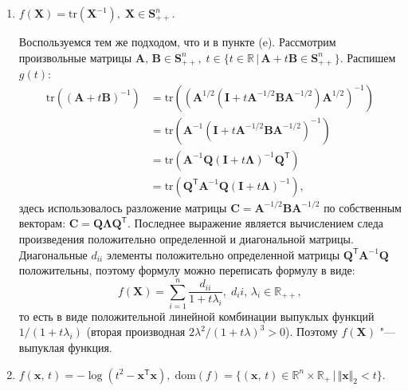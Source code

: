 \documentclass[a4paper,12pt]{article}
\begin{document}
\begin{enumerate}
\begin{enumerate}
			\item 
			$f(\mathbf{X}) = \text{tr}(\mathbf{X}^{-1}),\; \mathbf{X}\in\mathbf{S}_{++}^n$.
			
			Воспользуемся тем же подходом, что и в пункте (e). Рассмотрим произвольные матрицы $\mathbf{A},\,\mathbf{B}\in \mathbf{S}^n_{++},\; t\in \{t\in\mathbb{R}\,|\, \mathbf{A} + t\mathbf{B} \in \mathbf{S}^n_{++} \}$. Распишем $g(t)$:
			\begin{equation*}\begin{aligned}
				\text{tr}((\mathbf{A} + t\mathbf{B})^{-1})& = 
				\text{tr}((\mathbf{A}^{1/2}(\mathbf{I}+ t\mathbf{A}^{-1/2}\mathbf{B}\mathbf{A}^{-1/2})\mathbf{A}^{1/2})^{-1}) \\
				& =\text{tr}(\mathbf{A}^{-1}(\mathbf{I}+ t\mathbf{A}^{-1/2}\mathbf{B}\mathbf{A}^{-1/2})^{-1}) \\
				&= \text{tr}(\mathbf{A}^{-1}\mathbf{Q}(\mathbf{I}+ t\mathbf{\Lambda})^{-1}\mathbf{Q}^\mathsf{T}) \\
				&= \text{tr}(\mathbf{Q}^\mathsf{T}\mathbf{A}^{-1}\mathbf{Q}(\mathbf{I}+ t\mathbf{\Lambda})^{-1}),
			\end{aligned}\end{equation*}
			здесь использовалось разложение матрицы $\mathbf{C} = \mathbf{A}^{-1/2}\mathbf{B}\mathbf{A}^{-1/2}$ по собственным векторам: $\mathbf{C} = \mathbf{Q}\mathbf{\Lambda}\mathbf{Q}^\mathsf{T}$. Последнее выражение является вычислением следа произведения положительно определенной и диагональной матрицы. Диагональные $d_{ii}$ элементы положительно определенной матрицы $ \mathbf{Q}^\mathsf{T}\mathbf{A}^{-1}\mathbf{Q} $ положительны, поэтому формулу можно переписать формулу в виде:
			\begin{equation*}
				f(\mathbf{X}) = \sum_{i=1}^{n} \frac{d_{ii}}{1 + t\lambda_i},\; d_ii,\,\lambda_i\in\mathbb{R}_{++}, 
			\end{equation*}
			то есть в виде положительной линейной комбинации выпуклых функций $1/({1+t\lambda_i})$ (вторая производная $2\lambda^2/(1+t\lambda)^3 > 0$). Поэтому $f(\mathbf{X})$ "--- выпуклая функция.
			
			\item
			$f(\mathbf{x},\,t) = -\log(t^2 - \mathbf{x}^\mathsf{T}\mathbf{x}),\; \text{dom}(f)=\{ (\mathbf{x},\,t)\in\mathbb{R}^n\times\mathbb{R}_+ \,|\, \Vert\mathbf{x}\Vert_2 < t\}$.
			

\end{enumerate}
\end{enumerate}
\end{document}
